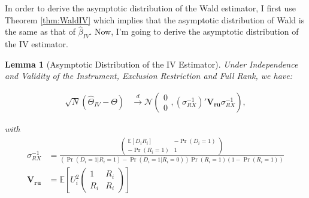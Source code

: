 \documentclass[
]{book}
\newcommand{\esp}[1]{\mathbb{E}[ #1 ]}
\newtheorem{lemma}{Lemma}[chapter]
\theoremstyle{definition}
\theoremstyle{definition}
\theoremstyle{definition}
\theoremstyle{definition}
\theoremstyle{remark}
\begin{document}
In order to derive the asymptotic distribution of the Wald estimator, I first use Theorem \ref{thm:WaldIV} which implies that the asymptotic distribution of Wald is the same as that of \(\hat{\beta}_{IV}\).
Now, I'm going to derive the asymptotic distribution of the IV estimator.

\begin{lemma}[Asymptotic Distribution of the IV Estimator]
\protect\hypertarget{lem:asympIV}{}{\label{lem:asympIV} \iffalse (Asymptotic Distribution of the IV Estimator) \fi{} }Under Independence and Validity of the Instrument, Exclusion Restriction and Full Rank, we have:

\begin{align*}
  \sqrt{N}(\hat{\Theta}_{IV}-\Theta) &  \stackrel{d}{\rightarrow}
  \mathcal{N}\left(\begin{array}{c} 0\\ 0\end{array},
  (\sigma_{RX}^{-1})'\mathbf{V_{ru}}\sigma_{RX}^{-1}\right), 
\end{align*}

with
\begin{align*}
\sigma_{RX}^{-1}& = \frac{\left(\begin{array}{cc}   \esp{D_iR_i} & -\Pr(D_i=1)\\
                                          -\Pr(R_i=1) & 1 
                          \end{array}\right)}{(\Pr(D_i=1|R_i=1)-\Pr(D_i=1|R_i=0))\Pr(R_i=1)(1-\Pr(R_i=1))}
                          \\
\mathbf{V_{ru}}&= \esp{U_i^2\left(\begin{array}{cc}  1 & R_i\\  R_i & R_i\end{array}\right)}                                                                
\end{align*}
\end{lemma}
\end{document}
